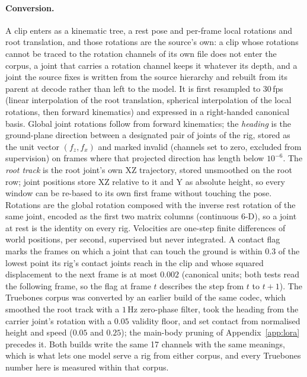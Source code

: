 \paragraph{Conversion.} A clip enters as a kinematic tree, a rest pose and per-frame local
rotations and root translation, and those rotations are the source's own: a clip whose rotations cannot be traced
to the rotation channels of its own file does not enter the corpus, a joint that carries a rotation channel keeps
it whatever its depth, and a joint the source fixes is written from the source hierarchy and rebuilt from its
parent at decode rather than left to the model. It is first resampled to 30\,fps (linear interpolation of the root
translation, spherical interpolation of the local rotations, then forward kinematics) and expressed
in a right-handed canonical basis. Global joint rotations follow from forward kinematics; the
\emph{heading} is the ground-plane direction between a designated pair of joints of the rig,
stored as the unit vector $(f_z, f_x)$ and marked invalid (channels set to zero, excluded from
supervision) on frames where that projected direction has length below $10^{-6}$. The \emph{root
track} is the root joint's own XZ trajectory, stored unsmoothed on the root row; joint positions store
XZ relative to it and Y as absolute height, so every window can be re-based to its own first frame
without touching the pose. Rotations are the global rotation composed with the inverse rest rotation of the same joint,
encoded as the first two matrix columns (continuous 6-D), so a joint at rest is the identity on every
rig. Velocities are one-step finite differences of world positions, per second, supervised but never
integrated. A contact flag marks the frames on which a joint that can touch the ground is within
$0.3$ of the lowest point its rig's contact joints reach in the clip and whose squared displacement to
the next frame is at most $0.002$ (canonical units; both tests read the following frame, so the flag
at frame $t$ describes the step from $t$ to $t{+}1$). The Truebones corpus was converted by an earlier
build of the same codec, which smoothed the root track with a $1$\,Hz zero-phase filter, took the
heading from the carrier joint's rotation with a $0.05$ validity floor, and set contact from
normalised height and speed ($0.05$ and $0.25$); the main-body pruning of Appendix~\ref{app:lora}
precedes it. Both builds write the same 17 channels with the same meanings, which is what lets one
model serve a rig from either corpus, and every Truebones number here is measured within that corpus.

